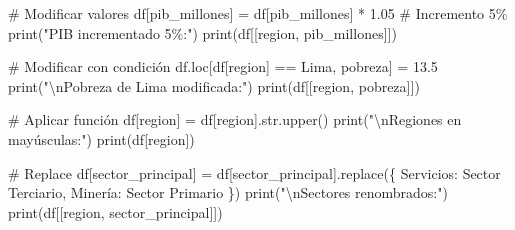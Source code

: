 \documentclass[
  doc,
  floatsintext,
  longtable,
  a4paper,
  nolmodern,
  notxfonts,
  notimes,
  12pt,
  colorlinks=true,linkcolor=blue,citecolor=blue,urlcolor=blue]{apa7}
\newenvironment{Shaded}{\begin{snugshade}}{\end{snugshade}}
\newcommand{\BuiltInTok}[1]{\textcolor[rgb]{0.00,0.23,0.31}{#1}}
\newcommand{\CharTok}[1]{\textcolor[rgb]{0.13,0.47,0.30}{#1}}
\newcommand{\CommentTok}[1]{\textcolor[rgb]{0.37,0.37,0.37}{#1}}
\newcommand{\FloatTok}[1]{\textcolor[rgb]{0.68,0.00,0.00}{#1}}
\newcommand{\NormalTok}[1]{\textcolor[rgb]{0.00,0.23,0.31}{#1}}
\newcommand{\OperatorTok}[1]{\textcolor[rgb]{0.37,0.37,0.37}{#1}}
\newcommand{\StringTok}[1]{\textcolor[rgb]{0.13,0.47,0.30}{#1}}
\begin{document}
\begin{Shaded}
\begin{Highlighting}[]
\CommentTok{\# Modificar valores}
\NormalTok{df[}\StringTok{\textquotesingle{}pib\_millones\textquotesingle{}}\NormalTok{] }\OperatorTok{=}\NormalTok{ df[}\StringTok{\textquotesingle{}pib\_millones\textquotesingle{}}\NormalTok{] }\OperatorTok{*} \FloatTok{1.05}  \CommentTok{\# Incremento 5\%}
\BuiltInTok{print}\NormalTok{(}\StringTok{"PIB incrementado 5\%:"}\NormalTok{)}
\BuiltInTok{print}\NormalTok{(df[[}\StringTok{\textquotesingle{}region\textquotesingle{}}\NormalTok{, }\StringTok{\textquotesingle{}pib\_millones\textquotesingle{}}\NormalTok{]])}

\CommentTok{\# Modificar con condición}
\NormalTok{df.loc[df[}\StringTok{\textquotesingle{}region\textquotesingle{}}\NormalTok{] }\OperatorTok{==} \StringTok{\textquotesingle{}Lima\textquotesingle{}}\NormalTok{, }\StringTok{\textquotesingle{}pobreza\textquotesingle{}}\NormalTok{] }\OperatorTok{=} \FloatTok{13.5}
\BuiltInTok{print}\NormalTok{(}\StringTok{"}\CharTok{\textbackslash{}n}\StringTok{Pobreza de Lima modificada:"}\NormalTok{)}
\BuiltInTok{print}\NormalTok{(df[[}\StringTok{\textquotesingle{}region\textquotesingle{}}\NormalTok{, }\StringTok{\textquotesingle{}pobreza\textquotesingle{}}\NormalTok{]])}

\CommentTok{\# Aplicar función}
\NormalTok{df[}\StringTok{\textquotesingle{}region\textquotesingle{}}\NormalTok{] }\OperatorTok{=}\NormalTok{ df[}\StringTok{\textquotesingle{}region\textquotesingle{}}\NormalTok{].}\BuiltInTok{str}\NormalTok{.upper()}
\BuiltInTok{print}\NormalTok{(}\StringTok{"}\CharTok{\textbackslash{}n}\StringTok{Regiones en mayúsculas:"}\NormalTok{)}
\BuiltInTok{print}\NormalTok{(df[}\StringTok{\textquotesingle{}region\textquotesingle{}}\NormalTok{])}

\CommentTok{\# Replace}
\NormalTok{df[}\StringTok{\textquotesingle{}sector\_principal\textquotesingle{}}\NormalTok{] }\OperatorTok{=}\NormalTok{ df[}\StringTok{\textquotesingle{}sector\_principal\textquotesingle{}}\NormalTok{].replace(\{}
    \StringTok{\textquotesingle{}Servicios\textquotesingle{}}\NormalTok{: }\StringTok{\textquotesingle{}Sector Terciario\textquotesingle{}}\NormalTok{,}
    \StringTok{\textquotesingle{}Minería\textquotesingle{}}\NormalTok{: }\StringTok{\textquotesingle{}Sector Primario\textquotesingle{}}
\NormalTok{\})}
\BuiltInTok{print}\NormalTok{(}\StringTok{"}\CharTok{\textbackslash{}n}\StringTok{Sectores renombrados:"}\NormalTok{)}
\BuiltInTok{print}\NormalTok{(df[[}\StringTok{\textquotesingle{}region\textquotesingle{}}\NormalTok{, }\StringTok{\textquotesingle{}sector\_principal\textquotesingle{}}\NormalTok{]])}
\end{Highlighting}
\end{Shaded}
\end{document}
